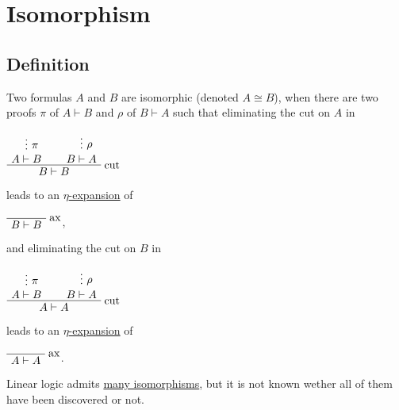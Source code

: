 \section{Isomorphism}\label{isomorphism}

\subsection{Definition}

Two formulas \(A\) and \(B\) are isomorphic (denoted \(A\cong B\)), when
there are two proofs \(\pi\) of \(A \vdash B\) and \(\rho\) of
\(B \vdash A\) such that eliminating the cut on \(A\) in

\(\AxRule{}\VdotsRule{\pi}{A \vdash B}\AxRule{}\VdotsRule{\rho}{B \vdash A}\LabelRule{\rulename{cut}}\BinRule{B\vdash B}\DisplayProof\)

leads to an
\hyperref[expansion-of-identities]{\(\eta\)-expansion} of

\(\LabelRule{\rulename{ax}}\NulRule{B\vdash B}\DisplayProof\),

and eliminating the cut on \(B\) in

\(\AxRule{}\VdotsRule{\pi}{A \vdash B}\AxRule{}\VdotsRule{\rho}{B \vdash A}\LabelRule{\rulename{cut}}\BinRule{A\vdash A}\DisplayProof\)

leads to an
\hyperref[expansion-of-identities]{\(\eta\)-expansion} of

\(\LabelRule{\rulename{ax}}\NulRule{A\vdash A}\DisplayProof\).

Linear logic admits \hyperref[list-of-isomorphisms]{many isomorphisms}, but
it is not known wether all of them have been discovered or not.


